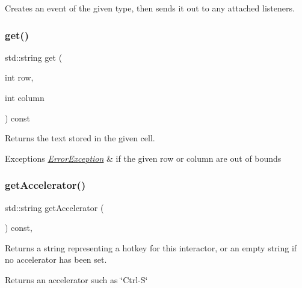 Creates an event of the given type, then sends it out to any attached listeners. 

\mbox{\label{classGTable_aaa9971dcb7e1b082abd3b9010667f041}} 
\subsubsection{\texorpdfstring{get()}{get()}}
{\footnotesize\ttfamily std\+::string get (\begin{DoxyParamCaption}\item[{int}]{row,  }\item[{int}]{column }\end{DoxyParamCaption}) const\hspace{0.3cm}{\ttfamily [virtual]}}



Returns the text stored in the given cell. 


\begin{DoxyExceptions}{Exceptions}
{\em \mbox{\hyperlink{classErrorException}{Error\+Exception}}} & if the given row or column are out of bounds \\
\hline
\end{DoxyExceptions}
\mbox{\label{classGInteractor_a69f8d23ed8f207fbecad99960776e942}} 
\subsubsection{\texorpdfstring{get\+Accelerator()}{getAccelerator()}}
{\footnotesize\ttfamily std\+::string get\+Accelerator (\begin{DoxyParamCaption}{ }\end{DoxyParamCaption}) const\hspace{0.3cm}{\ttfamily [virtual]}, {\ttfamily [inherited]}}



Returns a string representing a hotkey for this interactor, or an empty string if no accelerator has been set. 

\begin{DoxyReturn}{Returns}
an accelerator such as \char`\"{}\+Ctrl-\/\+S\char`\"{} 
\end{DoxyReturn}


